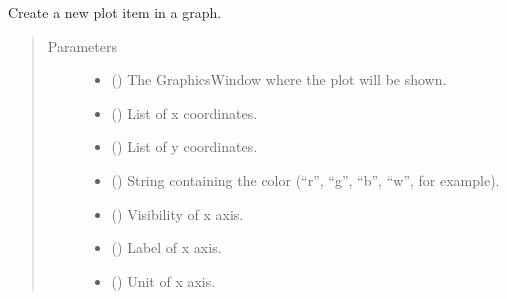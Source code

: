 \documentclass[a4paper,10pt,english]{sphinxmanual}
\begin{document}
\begin{fulllineitems}
\label{\detokenize{autodoc/mrsprint/mrsprint.simulator:mrsprint.simulator.plot.plot_item}}
Create a new plot item in a graph.
\begin{quote}\begin{description}
\item[{Parameters}] \leavevmode\begin{itemize}
\item {} 
 () \textendash{} The GraphicsWindow where the plot will be shown.

\item {} 
 () \textendash{} List of x coordinates.

\item {} 
 () \textendash{} List of y coordinates.

\item {} 
 () \textendash{} String containing the color (“r”, “g”, “b”, “w”, for example).

\item {} 
 () \textendash{} Visibility of x axis.

\item {} 
 () \textendash{} Label of x axis.

\item {} 
 () \textendash{} Unit of x axis.


\end{itemize}
\end{description}
\end{quote}
\end{fulllineitems}
\end{document}
